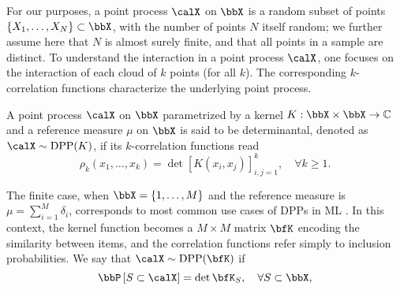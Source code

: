 \documentclass[twoside,11pt]{article}
\begin{document}
    For our purposes, a point process $\calX$ on $\bbX$ is a random subset of points $\lrcb{X_1, \dots, X_N} \subset \bbX$, with the number of points $N$ itself random; we further assume here that $N$ is almost surely finite, and that all points in a sample are distinct.
    To understand the interaction in a point process $\calX$, one focuses on the interaction of each cloud of $k$ points (for all $k$). 
    The corresponding $k$-correlation functions characterize the underlying point process. 

    A point process $\calX$ on $\bbX$ parametrized by a kernel $K:\bbX\times \bbX\rightarrow \mathbb{C}$ and a reference measure $\mu$ on $\bbX$ is said to be determinantal, denoted as $\calX\sim\DPP(K)$, if its $k$-correlation functions read
    \begin{equation}
    \label{eq:k-correlation_function_DPP}
      \rho_k(x_1,\dots,x_k)
        = \det [K(x_i, x_j)]_{i,j=1}^k,
      \quad \forall k\geq 1.
    \end{equation}

    The finite case, when $\bbX = \lrcb{1,\dots,M}$ and the reference measure is $\mu=\sum_{i=1}^M \delta_i$, corresponds to most common use cases of DPPs in ML \citep{KuTa12}.
    In this context, the kernel function becomes a $M\times M$ matrix $\bfK$ encoding the similarity between items, and the correlation functions refer simply to inclusion probabilities.
    We say that $\calX\sim \DPP(\bfK)$ if
    \begin{equation}
    \label{eq:inclusion_proba_finite}
      \Proba{S \subset \calX} = \det \bfK_S,
        \quad\forall S\subset \bbX,
    \end{equation}
\end{document}
